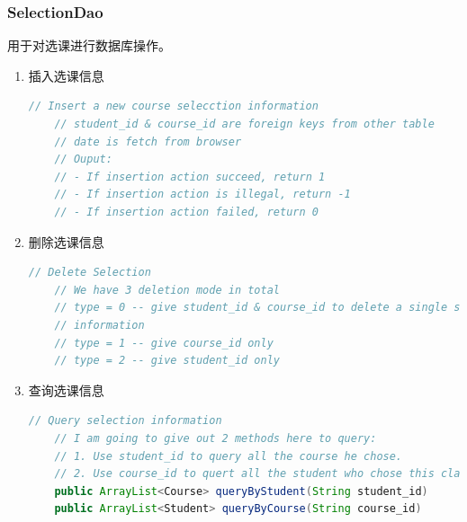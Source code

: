 \documentclass[../report.tex]{subfiles}
\begin{document}
\subsubsection{SelectionDao}
用于对选课进行数据库操作。
\begin{enumerate}
\itemsep 0em
\item 插入选课信息\\
\begin{lstlisting}[language=java,backgroundcolor=\color{lightgray}]
    // Insert a new course selecction information
    // student_id & course_id are foreign keys from other table
    // date is fetch from browser
    // Ouput:
    // - If insertion action succeed, return 1
    // - If insertion action is illegal, return -1
    // - If insertion action failed, return 0
\end{lstlisting}
\item 删除选课信息\\
\begin{lstlisting}[language=java,backgroundcolor=\color{lightgray}]
    // Delete Selection
    // We have 3 deletion mode in total
    // type = 0 -- give student_id & course_id to delete a single selection
    // information
    // type = 1 -- give course_id only
    // type = 2 -- give student_id only
\end{lstlisting}
\item 查询选课信息\\
\begin{lstlisting}[language=java,backgroundcolor=\color{lightgray}]
    // Query selection information
    // I am going to give out 2 methods here to query:
    // 1. Use student_id to query all the course he chose.
    // 2. Use course_id to quert all the student who chose this class.
    public ArrayList<Course> queryByStudent(String student_id)
    public ArrayList<Student> queryByCourse(String course_id)
\end{lstlisting}
\end{enumerate}
\end{document}
